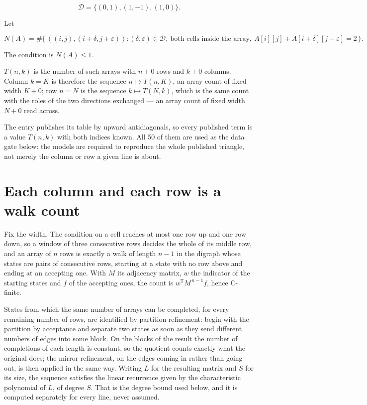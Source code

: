 \documentclass[11pt]{article}
\theoremstyle{definition}
\begin{document}
\[\mathcal{D} = \{(0,1), (1,-1), (1,0)\}.\]

Let

\[N(A) = \#\bigl\{\,((i,j),(i{+}\delta,j{+}\varepsilon)) : (\delta,\varepsilon) \in \mathcal{D},\ \text{both cells inside the array},\ A[i][j] + A[i{+}\delta][j{+}\varepsilon] = 2\,\bigr\}.\]

The condition is $N(A) \le 1$.

$T(n,k)$ is the number of such arrays with $n + 0$ rows and $k + 0$ columns. Column $k = K$ is therefore the sequence $n \mapsto T(n,K)$, an array count of fixed width $K + 0$; row $n = N$ is the sequence $k \mapsto T(N,k)$, which is the same count with the roles of the two directions exchanged --- an array count of fixed width $N + 0$ read across.

The entry publishes its table by upward antidiagonals, so every published term is a value $T(n,k)$ with both indices known. All 50 of them are used as the data gate below: the models are required to reproduce the whole published triangle, not merely the column or row a given line is about.

\section{Each column and each row is a walk count}

Fix the width. The condition on a cell reaches at most one row up and one row down, so a window of three consecutive rows decides the whole of its middle row, and an array of $n$ rows is exactly a walk of length $n-1$ in the digraph whose states are pairs of consecutive rows, starting at a state with no row above and ending at an accepting one. With $M$ its adjacency matrix, $w$ the indicator of the starting states and $f$ of the accepting ones, the count is $w^{\mathsf T}M^{\,n-1}f$, hence C-finite.

States from which the same number of arrays can be completed, for every remaining number of rows, are identified by partition refinement: begin with the partition by acceptance and separate two states as soon as they send different numbers of edges into some block. On the blocks of the result the number of completions of each length is constant, so the quotient counts exactly what the original does; the mirror refinement, on the edges coming in rather than going out, is then applied in the same way. Writing $L$ for the resulting matrix and $S$ for its size, the sequence satisfies the linear recurrence given by the characteristic polynomial of $L$, of degree $S$. That is the degree bound used below, and it is computed separately for every line, never assumed.
\end{document}
